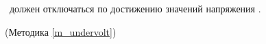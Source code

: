 \dut \ должен отключаться по достижению значений напряжения \undervolt.

\begin{flushright}
	(Методика \ref{m_undervolt})
\end{flushright}